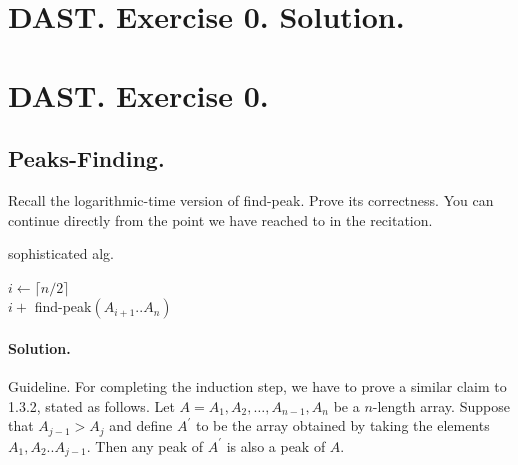 


\newcommand*{\EXERCISE}{}%
%


 

\newcommand*{\RECITATION}{}%


\ifdefined\SOLUTION
  \section{DAST. Exercise 0. Solution.}
\else
  \section{DAST. Exercise 0.}
\fi
\subsection{Peaks-Finding.} Recall the logarithmic-time version of find-peak. Prove its correctness. You can continue directly from the point we have reached to in the recitation.

\begin{algorithm}
\caption{sophisticated alg.}
$ i \leftarrow  \lceil n/2 \rceil $\\
         { 
          \Return $i + $ find-peak$\left(A_{i+1}..A_{n}\right)$
        }
\end{algorithm}

\ifdefined\SOLUTION
  \paragraph{Solution.} Guideline. For completing the induction step, we have to prove a similar claim to 1.3.2, stated as follows. Let $A = A_{1},A_{2},\dots,A_{n-1},A_{n}$ be a $n$-length array. Suppose that $A_{j-1}>A_{j}$ and define $A^{\prime}$ to be the array obtained by taking the elements $A_{1},A_{2}..A_{j-1}$. Then any peak of $A^{\prime}$ is also a peak of $A$.
\fi


